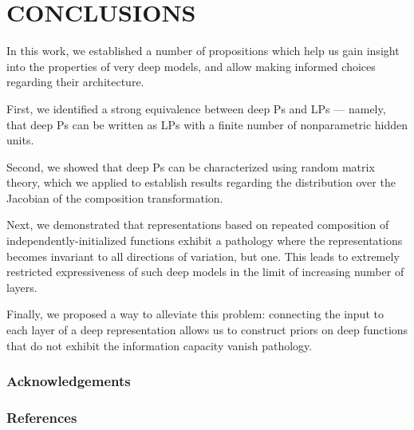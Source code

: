 \documentclass[twoside]{article}
\makeatletter
\newlength{\nonHumbleHeight}
\def\@humbleformat#1{{\settoheight{\nonHumbleHeight}{#1}\resizebox{!}{0.94\nonHumbleHeight}{#1}}}%
\def\humble#1{\@humbleformat{#1}}%
\newcommand{\gp}{{\humble GP}}
\newcommand{\MLP}{{\humble MLP}}
\newcommand{\sectiondist}{}
\makeatother
\begin{document}
\section{CONCLUSIONS}
\sectiondist

In this work, we established a number of propositions which help us gain insight into the properties of very deep models, and allow making informed choices regarding their architecture.

First, we identified a strong equivalence between deep \gp{}s and \MLP{}s --- namely, that deep \gp{}s can be written as \MLP{}s with a finite number of nonparametric hidden units. 

Second, we showed that deep \gp{}s can be characterized using random matrix theory, which we applied to establish results regarding the distribution over the Jacobian of the composition transformation.

Next, we demonstrated that representations based on repeated composition of independently-initialized functions exhibit a pathology where the representations becomes invariant to all directions of variation, but one. This leads to extremely restricted expressiveness of such deep models in the limit of increasing number of layers. 

Finally, we proposed a way to alleviate this problem: connecting the input to each layer of a deep representation allows us to construct priors on deep functions that do not exhibit the information capacity vanish pathology.


\subsubsection*{Acknowledgements}

\subsubsection*{References}
\vspace{-0.3in}
\renewcommand{\refname}{}



\end{document}
